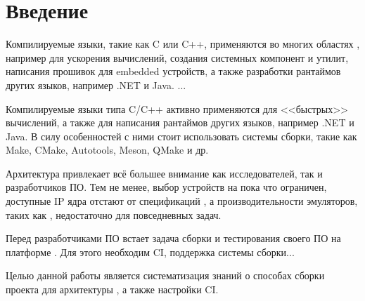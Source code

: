 
\section*{Введение}
\thispagestyle{withCompileDate}



Компилируемые языки, такие как \textsc{C} или \textsc{C++}, применяются во многих областях , например для ускорения вычислений, создания системных компонент и утилит, написания прошивок  для embedded  устройств, а также разработки рантаймов других языков, например .NET и Java.
...


Компилируемые языки типа C/C++ активно применяются для <<быстрых>> вычислений, а также для написания рантаймов других языков, например .NET и Java.
В силу особенностей  с ними стоит использовать системы сборки, такие как Make, CMake, Autotools, Meson, QMake и др.

Архитектура \riscv{} привлекает всё большее внимание как исследователей, так и разработчиков ПО.
Тем не менее, выбор устройств на \riscv{} пока что ограничен, доступные IP ядра отстают от спецификаций , а производительности эмуляторов, таких как \qemu{}, недостаточно для повседневных задач.

Перед разработчиками ПО встает задача сборки и тестирования своего ПО на платформе \riscv{}.
Для этого необходим CI, поддержка системы сборки...

Целью данной работы является систематизация знаний о способах сборки проекта для архитектуры \riscv{}, а также настройки CI.
